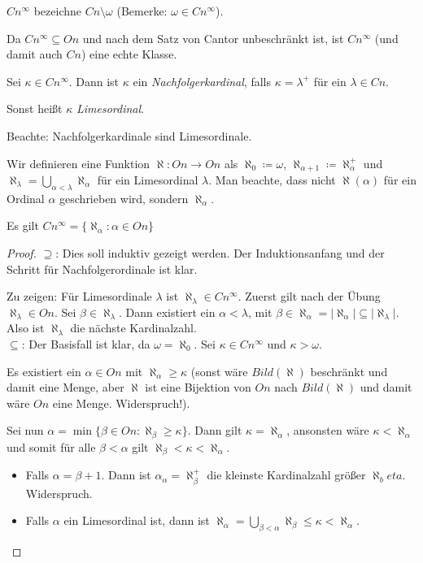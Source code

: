 \begin{definition}
	$Cn^\infty$ bezeichne $Cn\setminus\omega$ (Bemerke: $\omega\in Cn^\infty$).
\end{definition}

Da $Cn^\infty\subseteq On$ und nach dem Satz von Cantor unbeschränkt ist, ist $Cn^\infty$ (und damit auch $Cn$) eine echte Klasse.

\begin{definition}
	Sei $\kappa\in Cn^\infty$. Dann ist $\kappa$ ein \textit{Nachfolgerkardinal}, falls $\kappa=\lambda^+$ für ein $\lambda\in Cn$.
	
	Sonst heißt $\kappa$ \textit{Limesordinal}.
\end{definition}

Beachte: Nachfolgerkardinale sind Limesordinale.

\begin{definition}
	Wir definieren eine Funktion $\aleph:On\to On$ als $\aleph_0\coloneqq\omega$, $\aleph_{\alpha+1}\coloneqq \aleph_\alpha^+$ und $\aleph_\lambda=\bigcup_{\alpha<\lambda}\aleph_\alpha$ für ein Limesordinal $\lambda$. Man beachte, dass nicht $\aleph(\alpha)$ für ein Ordinal $\alpha$ geschrieben wird, sondern $\aleph_\alpha$.
\end{definition}

\begin{satz}
	Es gilt $Cn^\infty=\{\aleph_\alpha : \alpha\in On\}$
\end{satz}
\begin{proof}
	$\supseteq$: Dies soll induktiv gezeigt werden. Der Induktionsanfang und der Schritt für Nachfolgerordinale ist klar.
	
	Zu zeigen: Für Limesordinale $\lambda$ ist $\aleph_\lambda\in Cn^\infty$. Zuerst gilt nach der Übung $\aleph_\lambda\in On$. Sei $\beta\in \aleph_\lambda$. Dann existiert ein $\alpha<\lambda$, mit $\beta\in \aleph_\alpha=\vert\aleph_\alpha\vert\subseteq\vert \aleph_\lambda\vert$. Also ist $\aleph_\lambda$ die nächste Kardinalzahl.
	\\
	
	$\subseteq$: Der Basisfall ist klar, da $\omega=\aleph_0$. Sei $\kappa\in Cn^\infty$ und $\kappa>\omega$.
	
	Es existiert ein $\alpha\in On$ mit $\aleph_\alpha\geq\kappa$ (sonst wäre $Bild(\aleph)$ beschränkt und damit eine Menge, aber $\aleph$ ist eine Bijektion von $On$ nach $Bild(\aleph)$ und damit wäre $On$ eine Menge. Widerspruch!).
		
	Sei nun $\alpha=\min\{\beta\in On : \aleph_\beta \geq \kappa\}$. Dann gilt $\kappa=\aleph_\alpha$, ansonsten wäre $\kappa<\aleph_\alpha$ und somit für alle $\beta<\alpha$ gilt $\aleph_\beta < \kappa < \aleph_\alpha$.
	\begin{itemize}
		\item Falls $\alpha=\beta+1$. Dann ist $\alpha_\alpha=\aleph_\beta^+$ die kleinste Kardinalzahl größer $\aleph_beta$. Widerspruch.
		\item Falls $\alpha$ ein Limesordinal ist, dann ist $\aleph_\alpha=\bigcup_{\beta<\alpha}\aleph_\beta\leq \kappa < \aleph_\alpha$.
	\end{itemize}
\end{proof}



